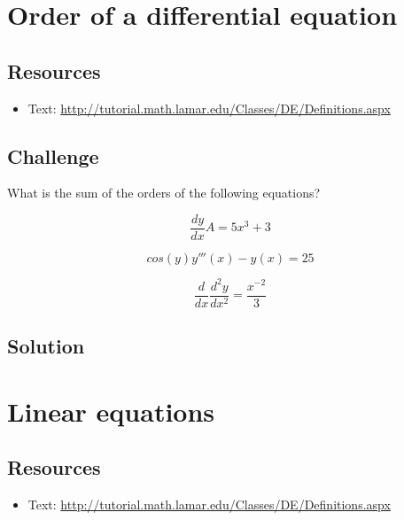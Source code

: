 \section{Order of a differential equation}

\subsection*{Resources}
\begin{itemize}
    \item Text: \url{http://tutorial.math.lamar.edu/Classes/DE/Definitions.aspx}
\end{itemize}

\subsection*{Challenge}
What is the sum of the orders of the following equations?

\begin{equation}
    \frac{dy}{dx}A = 5x^3 + 3
\end{equation}

\begin{equation}
    cos(y) y'''(x) - y(x) = 25
\end{equation}

\begin{equation}
    \frac{d}{dx} \frac{d^2 y}{dx^2} = \frac{x^{-2}}{3}
\end{equation}

\subsection*{Solution}
\six{}


\timebox


\newpage

\section{Linear equations}

\subsection*{Resources}
\begin{itemize}
    \item Text: \url{http://tutorial.math.lamar.edu/Classes/DE/Definitions.aspx}
\end{itemize}

